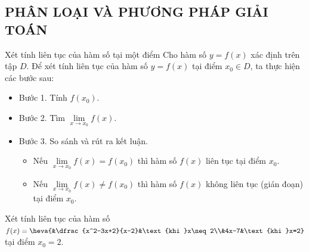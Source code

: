 \subsection{PHÂN LOẠI VÀ PHƯƠNG PHÁP GIẢI TOÁN}
\setcounter{dang}{0}
\begin{dang}{Xét tính liên tục của hàm số tại một điểm}
	Cho hàm số $y=f(x)$ xác định trên tập $D$. Để xét tính liên tục của hàm số $y=f(x)$ tại điểm $x_{0}\in D$, ta thực hiện các bước sau:
	\begin{itemize}
		\item [\iconMT] Bước 1. Tính $f(x_0)$.
		\item [\iconMT] Bước 2. Tìm $\lim\limits_{x\to x_0}f(x)$.
		\item [\iconMT] Bước 3. So sánh và rút ra kết luận.
		\begin{itemize}
			\item Nếu $\lim\limits_{x\to x_0}f(x)=f(x_0)$ thì hàm số $f(x)$ liên tục tại điểm $x_0$.
			\item Nếu $\lim\limits_{x\to x_0}f(x)\ne f(x_0)$ thì hàm số $f(x)$ không liên tục (gián đoạn) tại điểm $x_0$.
		\end{itemize}
	\end{itemize}
\end{dang}

\begin{vd}%
	Xét tính liên tục của hàm số $f(x)=\heva{&\dfrac{x^2-3x+2}{x-2}&\text{khi }x\neq 2\\&4x-7&\text{khi }x=2}$ tại điểm $x_0=2$.
\end{vd} 

